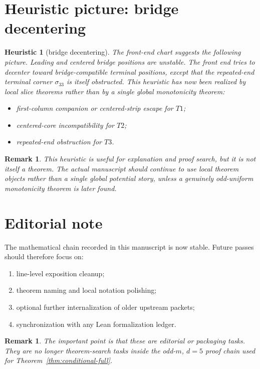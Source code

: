 \documentclass[11pt]{article}
\newtheorem{remark}[theorem]{Remark}
\newtheorem{heuristic}[theorem]{Heuristic}
\newcommand{\sig}[2]{\sigma_{#1#2}}
\begin{document}
\section{Heuristic picture: bridge decentering}

\begin{heuristic}[bridge decentering]
The front-end chart suggests the following picture.
Leading and centered bridge positions are unstable.
The front end tries to decenter toward bridge-compatible terminal positions,
except that the repeated-end terminal corner \(\sig33\) is itself obstructed.
This heuristic has now been realized by local slice theorems rather than by a
single global monotonicity theorem:
\begin{itemize}[leftmargin=2.4em]
\item first-column companion or centered-strip escape for \(T1\);
\item centered-core incompatibility for \(T2\);
\item repeated-end obstruction for \(T3\).
\end{itemize}
\end{heuristic}

\begin{remark}
This heuristic is useful for explanation and proof search, but it is not itself
a theorem.
The actual manuscript should continue to use local theorem objects rather than a
single global potential story, unless a genuinely odd-uniform monotonicity
theorem is later found.
\end{remark}

\section{Editorial note}

The mathematical chain recorded in this manuscript is now stable.
Future passes should therefore focus on:
\begin{enumerate}[label=\textup{(\arabic*)},leftmargin=2.8em]
\item line-level exposition cleanup;
\item theorem naming and local notation polishing;
\item optional further internalization of older upstream packets;
\item synchronization with any Lean formalization ledger.
\end{enumerate}

\begin{remark}
The important point is that these are editorial or packaging tasks.
They are no longer theorem-search tasks inside the odd-$m$, $d=5$ proof chain
used for Theorem~\ref{thm:conditional-full}.
\end{remark}
\end{document}

